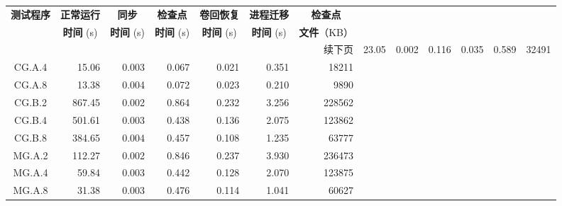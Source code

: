 \begin{ThreePartTable}
\begin{longtable}[c]{c*{6}{r}}
        \toprule
        \textbf{测试程序\tnote{b}} & \multicolumn{1}{c}{\textbf{正常运行}}   & \multicolumn{1}{c}{\textbf{同步}}
                               & \multicolumn{1}{c}{\textbf{检查点}}    & \multicolumn{1}{c}{\textbf{卷回恢复}}
                               & \multicolumn{1}{c}{\textbf{进程迁移}}   & \multicolumn{1}{c}{\textbf{检查点}}                                              \\
                               & \multicolumn{1}{c}{\textbf{时间} (s)} & \multicolumn{1}{c}{\textbf{时间} (s)}
                               & \multicolumn{1}{c}{\textbf{时间} (s)} & \multicolumn{1}{c}{\textbf{时间} (s)}
                               & \multicolumn{1}{c}{\textbf{时间} (s)} & \textbf{文件}（KB）                                                               \\
        \midrule
        \endhead
        \hline
        \multicolumn{7}{r}{续下页}
        \endfoot
        \insertTableNotes
        \endlastfoot
        CG.C.2                 & 23.05                               & 0.002                               & 0.116          & 0.035 & 0.589 & 32491  \\
        CG.A.4                 & 15.06                               & 0.003                               & 0.067          & 0.021 & 0.351 & 18211  \\
        CG.A.8                 & 13.38                               & 0.004                               & 0.072          & 0.023 & 0.210 & 9890   \\
        CG.B.2                 & 867.45                              & 0.002                               & 0.864          & 0.232 & 3.256 & 228562 \\
        CG.B.4                 & 501.61                              & 0.003                               & 0.438          & 0.136 & 2.075 & 123862 \\
        CG.B.8                 & 384.65                              & 0.004                               & 0.457          & 0.108 & 1.235 & 63777  \\
        MG.A.2                 & 112.27                              & 0.002                               & 0.846\tnote{a} & 0.237 & 3.930 & 236473 \\
        MG.A.4                 & 59.84                               & 0.003                               & 0.442          & 0.128 & 2.070 & 123875 \\
        MG.A.8                 & 31.38                               & 0.003                               & 0.476          & 0.114 & 1.041 & 60627  \\

\end{longtable}
\end{ThreePartTable}
